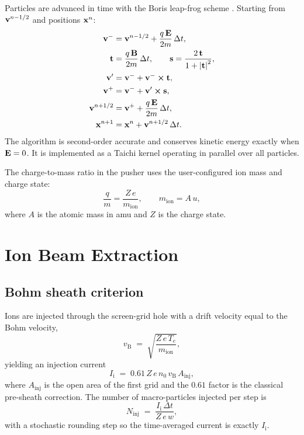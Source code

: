 \documentclass[11pt,a4paper]{article}
\begin{document}
Particles are advanced in time with the Boris leap-frog scheme
\cite{birdsall}.  Starting from \(\vb{v}^{n-1/2}\) and positions
\(\vb{x}^{n}\):
\begin{align}
    \vb{v}^{-} &= \vb{v}^{n-1/2} + \frac{q\,\vb{E}}{2m}\,\Delta t,\\
    \vb{t} &= \frac{q\,\vb{B}}{2m}\,\Delta t, \qquad
    \vb{s} = \frac{2\,\vb{t}}{1 + \abs{\vb{t}}^{2}},\\
    \vb{v}' &= \vb{v}^{-} + \vb{v}^{-}\cross\vb{t},\\
    \vb{v}^{+} &= \vb{v}^{-} + \vb{v}'\cross\vb{s},\\
    \vb{v}^{n+1/2} &= \vb{v}^{+} + \frac{q\,\vb{E}}{2m}\,\Delta t,\\
    \vb{x}^{n+1} &= \vb{x}^{n} + \vb{v}^{n+1/2}\,\Delta t.
\end{align}
The algorithm is second-order accurate and conserves kinetic
energy exactly when \(\vb{E}=0\).  It is implemented as a Taichi
kernel operating in parallel over all particles.

The charge-to-mass ratio in the pusher uses the
user-configured ion mass and charge state:
\begin{equation}
    \frac{q}{m} = \frac{Z\,e}{m_{\mathrm{ion}}},
    \qquad m_{\mathrm{ion}} = A\,u,
\end{equation}
where \(A\) is the atomic mass in amu and \(Z\) is the charge state.

\section{Ion Beam Extraction}

\subsection{Bohm sheath criterion}

Ions are injected through the screen-grid hole with a drift
velocity equal to the Bohm velocity,
\begin{equation}
    v_{\mathrm{B}} \;=\; \sqrt{\frac{Z\,e\,T_{e}}{m_{\mathrm{ion}}}},
    \label{eq:bohm}
\end{equation}
yielding an injection current
\begin{equation}
    I_{\mathrm{i}} \;=\; 0.61\,Z\,e\,n_{0}\,v_{\mathrm{B}}\,A_{\mathrm{inj}},
\end{equation}
where \(A_{\mathrm{inj}}\) is the open area of the first grid and
the \(0.61\) factor is the classical pre-sheath correction.
The number of macro-particles injected per step is
\begin{equation}
    N_{\mathrm{inj}} \;=\; \frac{I_{\mathrm{i}}\,\Delta t}{Z\,e\,w},
\end{equation}
with a stochastic rounding step so the time-averaged current is
exactly \(I_{\mathrm{i}}\).
\end{document}
